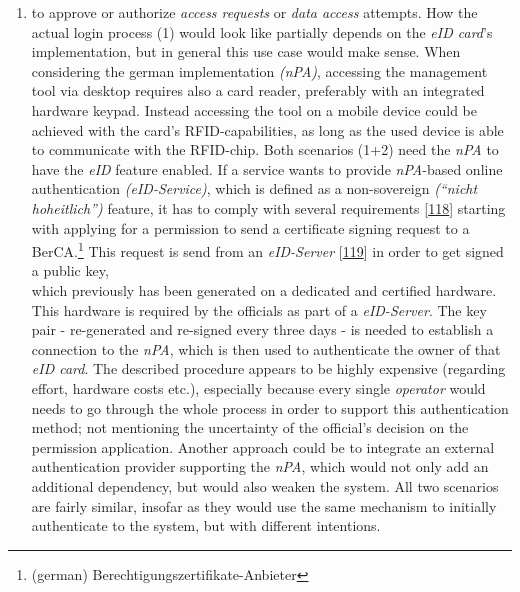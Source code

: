 \documentclass[12pt,english,a4paper,titlepage,cleardoublepage=empty,dottedtoc]{report}
\providecommand{\tightlist}{%
  \setlength{\itemsep}{0pt}\setlength{\parskip}{0pt}}
\begin{document}
\begin{enumerate}
\def\labelenumi{(\arabic{enumi})}
\setcounter{enumi}{1}
\tightlist
\item
  to approve or authorize \emph{access requests} or \emph{data access}
  attempts. How the actual login process (1) would look like partially
  depends on the \emph{eID card}'s implementation, but in general this
  use case would make sense. When considering the german implementation
  \emph{(nPA)}, accessing the management tool via desktop requires also
  a card reader, preferably with an integrated hardware keypad. Instead
  accessing the tool on a mobile device could be achieved with the
  card's RFID-capabilities, as long as the used device is able to
  communicate with the RFID-chip. Both scenarios (1+2) need the
  \emph{nPA} to have the \emph{eID} feature enabled. If a service wants
  to provide \emph{nPA}-based online authentication
  \emph{(eID-Service)}, which is defined as a non-sovereign
  \emph{(``nicht hoheitlich'')} feature, it has to comply with several
  requirements {[}\protect\hyperlink{ref-web_bsi-spec_eid}{118}{]}
  starting with applying for a permission to send a certificate signing
  request to a BerCA.\footnote{(german)
    Berechtigungszertifikate-Anbieter} This request is send from an
  \emph{eID-Server}
  {[}\protect\hyperlink{ref-web_2017_npa-eid-server}{119}{]} in order to
  get signed a public key,\\
  which previously has been generated on a dedicated and certified
  hardware. This hardware is required by the officials as part of a
  \emph{eID-Server}. The key pair - re-generated and re-signed every
  three days - is needed to establish a connection to the \emph{nPA},
  which is then used to authenticate the owner of that \emph{eID card}.
  The described procedure appears to be highly expensive (regarding
  effort, hardware costs etc.), especially because every single
  \emph{operator} would needs to go through the whole process in order
  to support this authentication method; not mentioning the uncertainty
  of the official's decision on the permission application. Another
  approach could be to integrate an external authentication provider
  supporting the \emph{nPA}, which would not only add an additional
  dependency, but would also weaken the system. All two scenarios are
  fairly similar, insofar as they would use the same mechanism to
  initially authenticate to the system, but with different intentions.
\end{enumerate}
\end{document}
